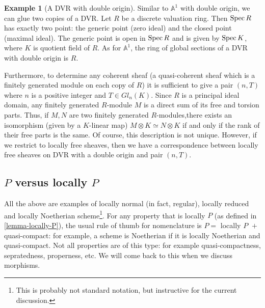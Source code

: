 \documentclass[11pt]{amsart}
\newcommand{\Spec}{{\rm Spec \,}}
\newcommand{\A}{{\mathbb A}}
\theoremstyle{definition}
\newtheorem{example}[theorem]{Example}
\begin{document}
\begin{example}[A DVR with double origin]\label{DVR-double-origin} Similar to $\A^1$ with double origin, we can glue two copies of a DVR. Let $R$ be a discrete valuation ring. Then $\Spec R$ has exactly two point: the generic point (zero ideal) and the closed point (maximal ideal). The generic point is open in $\Spec R$ and is given by $\Spec K$, where $K$ is quotient field of $R$. As for $\A^1$, the ring of global sections of a DVR with double origin is $R$.

Furthermore, to determine any coherent sheaf (a quasi-coherent sheaf which is a finitely generated module on each copy of $R$) it is sufficient to give a pair $(n,T)$ where $n$ is a positive integer and $T\in Gl_n(K)$. Since $R$ is a principal ideal domain, any finitely generated $R$-module $M$ is a direct sum of its free and torsion parts. Thus, if $M, N$ are two finitely generated $R$-modules,there exists an isomorphism (given by a $K$-linear map) $M\otimes K \simeq N\otimes K$ if and only if the rank of their free parts is the same. Of course, this description is not unique. However, if we restrict to locally free sheaves, then we have a correspondence between locally free sheaves on DVR with a double origin and pair $(n,T)$.
\end{example}

\begin{comment}
\begin{tikzcd}[remember picture]
	A \arrow[r] & B\\
	C \arrow[r] & D\\
\end{tikzcd}
\begin{tikzpicture}[overlay,remember picture]
\path (\tikzcdmatrixname-2-1) to node[midway,sloped]{$\subseteq$}
(\tikzcdmatrixname-1-1);
\path (\tikzcdmatrixname-2-2) to node[midway,sloped]{$\subseteq$}
(\tikzcdmatrixname-1-2);
\end{tikzpicture}
\end{comment}

\subsection{\texorpdfstring{$P$}{P} versus locally \texorpdfstring{$P$}{P}}\label{PvlP}
All the above are examples of locally normal (in fact, regular), locally reduced and locally Noetherian scheme\footnote{This is probably not standard notation, but instructive for the current discussion.}. For any property that is locally $P$ (as defined in \ref{lemma-locally-P}), the usual rule of thumb for nomenclature is $P=$ locally $P\,\,+$ quasi-compact: for example, a scheme is Noetherian if it is locally Noetherian and quasi-compact. Not all properties are of this type: for example quasi-compactness, sepratedness, properness, etc. We will come back to this when we discuss morphisms.
\end{document}
